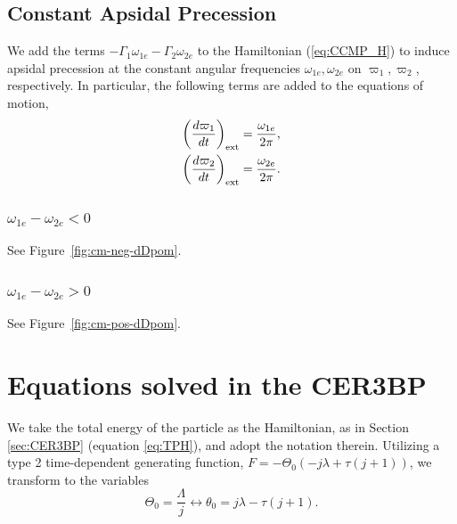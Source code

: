 \documentclass[usenatbib,twocolumn]{mnras}
\begin{document}
\subsection{Constant Apsidal Precession}
We add the terms $-\Gamma_1\omega_{1e}-\Gamma_2\omega_{2e}$ to the Hamiltonian (\ref{eq:CCMP_H}) to induce apsidal precession at the constant angular frequencies $\omega_{1e},\omega_{2e}$ on $\varpi_1,\varpi_2$, respectively. In particular, the following terms are added to the equations of motion,
\begin{align}
    \left(\frac{d\varpi_1 }{dt}\right)_{\rm ext} = \frac{\omega_{1e}}{2\pi}, \\
    \left(\frac{d\varpi_2 }{dt}\right)_{\rm ext} = \frac{\omega_{2e}}{2\pi}.
\end{align}

\subsubsection{$\omega_{1e}-\omega_{2e}<0$}
See Figure~\ref{fig:cm-neg-dDpom}.

\subsubsection{$\omega_{1e}-\omega_{2e}>0$}
See Figure~\ref{fig:cm-pos-dDpom}.








\clearpage


\clearpage
\onecolumn
\appendix
\section{Equations solved in the CER3BP}
We take the total energy of the particle as the Hamiltonian, as in Section \ref{sec:CER3BP} (equation \ref{eq:TPH}), and adopt the notation therein.
Utilizing a type 2 time-dependent generating function, $F=- \Theta_{0} \left(- j \lambda + \tau \left(j + 1\right)\right)$, we transform to the variables
\begin{equation}
    \Theta_{0} = \frac{\Lambda}{j} \longleftrightarrow
    \theta_0 = j \lambda - \tau \left(j + 1\right).
\end{equation}
\end{document}
